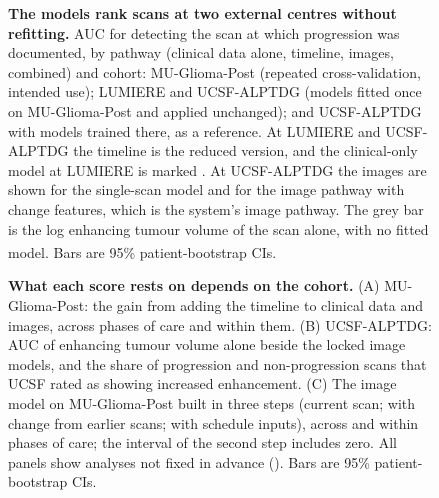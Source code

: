 \documentclass[largeformat]{interact} %
\newcommand{\expl}{\textsuperscript{\textdagger}}
\begin{document}
\begin{figure}[!htbp]
\centering
{}
\caption{\textbf{The models rank scans at two external centres without refitting.} AUC for detecting the scan at which
progression was documented, by pathway (clinical data alone, timeline, images, combined) and cohort: MU-Glioma-Post
(repeated cross-validation, intended use); LUMIERE and UCSF-ALPTDG (models fitted once on MU-Glioma-Post and applied
unchanged); and UCSF-ALPTDG with models trained there, as a reference. At LUMIERE and UCSF-ALPTDG the timeline is the
reduced version, and the clinical-only model at LUMIERE is marked \textdagger. At UCSF-ALPTDG the images are shown for the
single-scan model and for the image pathway with change features, which is the system's image pathway. The grey bar
is the log enhancing tumour volume of the scan alone, with no fitted model\expl. Bars are 95\% patient-bootstrap CIs.}
\label{fig:2}
\end{figure}

\begin{figure}[!htbp]
\centering
{}
\caption{\textbf{What each score rests on depends on the cohort.} (A) MU-Glioma-Post: the gain from adding the
timeline to clinical data and images, across phases of care and within them. (B) UCSF-ALPTDG: AUC of enhancing tumour
volume alone beside the locked image models, and the share of progression and non-progression scans that UCSF rated
as showing increased enhancement. (C) The image model on MU-Glioma-Post built in three steps (current scan; with
change from earlier scans; with schedule inputs), across and within phases of care; the interval of the second step includes zero. All panels show analyses not fixed in advance (\textdagger).
Bars are 95\% patient-bootstrap CIs.}
\label{fig:3}
\end{figure}
\end{document}
